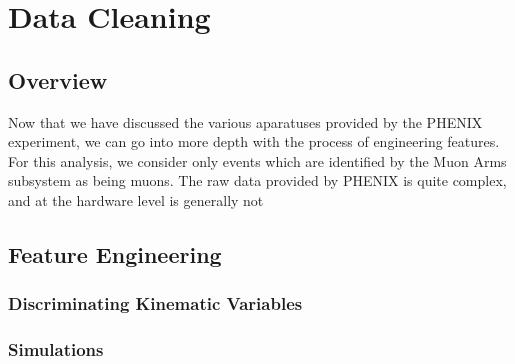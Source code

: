\chapter{Data Cleaning}
\label{ch:data_collection}
\section{Overview}
Now that we have discussed the various aparatuses provided by the PHENIX
experiment, we can go into more depth with the process of engineering features.
For this analysis, we consider only events which are identified by the Muon Arms
subsystem as being muons. The raw data provided by PHENIX is quite complex, and
at the hardware level is generally not 
\section{Feature Engineering}
\subsection{Discriminating Kinematic Variables}
\subsection{Simulations}
